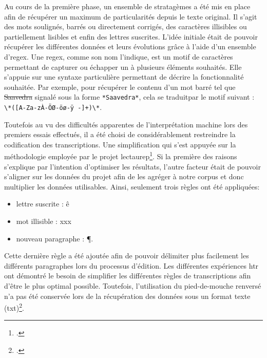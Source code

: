 	Au cours de la première phase, un ensemble de stratagèmes a été mis en place afin de récupérer un maximum de particularités depuis le texte original. Il s'agit des mots soulignés, barrés ou directement corrigés, des caractères illisibles ou partiellement lisibles et enfin des lettres suscrites. L'idée initiale était de pouvoir récupérer les différentes données et leurs évolutions grâce à l'aide d'un ensemble d'\gls{regex}. Une \gls{regex}, comme son nom l'indique, est un motif de caractères permettant de capturer ou échapper un à plusieurs éléments souhaités. Elle s'appuie sur une syntaxe particulière permettant de décrire la fonctionnalité souhaitée. Par exemple, pour récupérer le contenu d'un mot barré tel que \sout{Saavedra} signalé sous la forme \verb/*Saavedra*/, cela se traduitpar le motif suivant : \verb/\*([A-Za-zÀ-ÖØ-öø-ÿ -]+)\*/.
	
	Toutefois au vu des difficultés apparentes de l'interprétation machine lors des premiers essais effectués, il a été choisi de considérablement restreindre la codification des transcriptions. Une simplification qui s'est appuyée sur la méthodologie employée par le projet \gls{lectaurep}\footcite{durandNotairesParisRepertoires2021}. Si la première des raisons s'explique par l'intention d'optimiser les résultats, l'autre facteur était de pouvoir s'aligner sur les données du projet afin de les agréger à notre corpus et donc multiplier les données utilisables. Ainsi, seulement trois règles ont été appliquées:
	
	\begin{itemize}
	    \item lettre suscrite : \^e
	    \item mot illisible : xxx
	    \item nouveau paragraphe : \P.
	\end{itemize}
	
	 Cette dernière règle a été ajoutée afin de pouvoir délimiter plus facilement les différents paragraphes lors du processus d'édition. Les différentes expériences \gls{htr} ont démontré le besoin de simplifier les différentes règles de transcriptions afin d'être le plus optimal possible. Toutefois, l'utilisation du pied-de-mouche renversé n'a pas été conservée lors de la récupération des données sous un format texte (txt)\footcite{humeauPreprocessingHTR2022}.
	 
